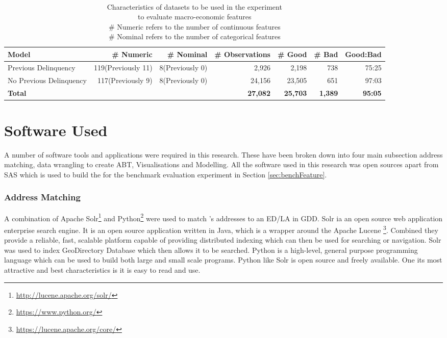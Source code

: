 \begin{table}[H]
	\centering\
	\resizebox{\textwidth}{!}
	{
		\begin{tabular}{l r r r r r r}
			\hline
			\textbf{Model} &  \textbf{\# Numeric} & \textbf{\# Nominal} & \textbf{\# Observations} & \textbf{\# Good} & \textbf{\# Bad} & \textbf{Good:Bad}\\
			\hline
			Previous Delinquency & 119(Previously 11) & 8(Previously 0) & 2,926 & 2,198  & 738 & 75:25 \\ 
			No Previous Delinquency & 117(Previously 9)  & 8(Previously 0) & 24,156 & 23,505 & 651  & 97:03 \\ \hline
			\textbf{Total} &  &  & \textbf{27,082} & \textbf{25,703} & \textbf{1,389} & \textbf{95:05} \\ \hline
		\end{tabular}
	}
	\caption{Characteristics of datasets to be used in the experiment \\to evaluate macro-economic features \\
		\# Numeric refers to the number of continuous features \\
		\# Nominal refers to the number of categorical features
	}
	\label{characteristicsMacroDatasets}
\end{table}

\section{Software Used}\label{chp3:softwareUsed}
A number of software tools and applications were required in this research. These have been broken down into four main subsection address matching, data wrangling to create ABT, Visualisations and Modelling. All the software used in this research was open sources apart from SAS which is used to build the for the benchmark evaluation experiment in Section \ref{sec:benchFeature}. 
 
\subsubsection{Address Matching}
A combination of Apache Solr\footnote{\url{http://lucene.apache.org/solr/}} and Python\footnote{\url{https://www.python.org/}} were used to match \subjectname's addresses to an ED/LA in GDD. Solr ia an open source web application enterprise search engine. It is an open source application written in Java, which is a wrapper around the Apache Lucene \footnote{{\url{https://lucene.apache.org/core/}}}. Combined they provide a reliable, fast, scalable platform capable of providing distributed indexing which can then be used for searching or navigation. Solr was used to index GeoDirectory Database which then allows it to be searched. Python is a high-level, general purpose programming language which can be used to build both large and small scale programs. Python like Solr is open source and freely available. One its most attractive and best characteristics is it is easy to read and use.

